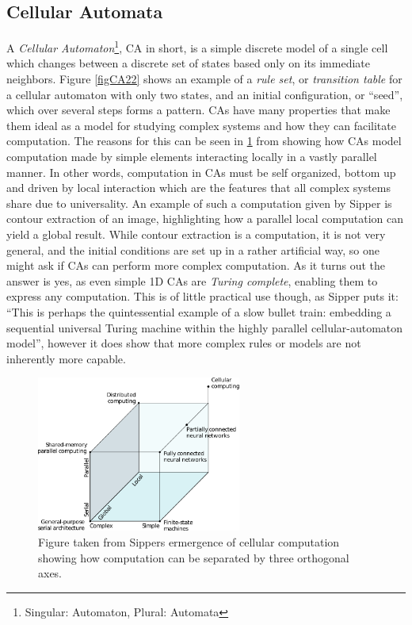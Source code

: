 \subsection{Cellular Automata}
A \emph{Cellular Automaton}\footnote{Singular: Automaton, Plural: Automata}, CA
in short, is a simple discrete model of a single cell which changes between a
discrete set of states based only on its immediate neighbors.
Figure \ref{figCA22} shows an example of a \emph{rule set}, or \emph{transition
  table} for a cellular automaton with only two states, and an initial
configuration, or ``seed'', which over several steps forms a pattern.
%
CAs have many properties that make them ideal as a model for studying complex
systems and how they can facilitate computation.
The reasons for this can be seen in \ref{figSipperClass} from
\cite{sipper_emergence_1999}
showing how CAs model computation made by simple elements interacting locally in
a vastly parallel manner.
%
In other words, computation in CAs must be self organized, bottom up and driven by
local interaction which are the features that all complex systems share due to
universality.
%
An example of such a computation given by Sipper is contour extraction of an
image, highlighting how a parallel local computation can yield a global result.
%
While contour extraction is a computation, it is not very general, and the initial
conditions are set up in a rather artificial way, so one might ask if CAs can
perform more complex computation.
As it turns out the answer is yes, as even simple 1D CAs are \emph{Turing
  complete}, enabling them to express any computation.
This is of little practical use though, as Sipper puts it: ``This is perhaps the
quintessential example of a slow bullet train: embedding a sequential universal
Turing machine within the highly parallel cellular-automaton model'', however it
does show that more complex rules or models are not inherently more capable.
\begin{figure}[h!]
  \centering
  \includegraphics[width=0.6\textwidth]{fig/sipperComp.png}
  \caption{
    Figure taken from Sippers ermergence of cellular computation showing
    how computation can be separated by three orthogonal axes.
    }
  \label{figSipperClass}
\end{figure}
